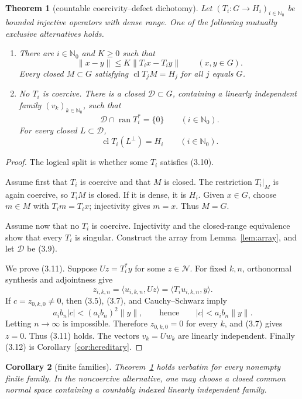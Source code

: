 \documentclass[11pt]{article}
\newtheorem{theorem}{Theorem}[section]
\newtheorem{corollary}[theorem]{Corollary}
\newcommand{\N}{\mathbb N_0}
\newcommand{\ran}{\operatorname{ran}}
\newcommand{\clos}{\operatorname{cl}}
\newcommand{\cD}{\mathcal D}
\newcommand{\cN}{\mathcal N}
\newcommand{\ip}[2]{\langle #1,#2\rangle}
\begin{document}
\begin{theorem}[countable coercivity--defect dichotomy]\label{thm:dichotomy}
Let \((T_i:G\to H_i)_{i\in\N}\) be bounded injective operators with dense
range.  One of the following mutually exclusive alternatives holds.
\begin{enumerate}[label=\textup{(\Roman*)}]
  \item There are \(i\in\N\) and \(K\ge0\) such that
  \[
    \|x-y\|\le K\|T_i x-T_i y\|\qquad(x,y\in G).
    \tag{3.10}
  \]
  Every closed \(M\subset G\) satisfying
  \(\clos{T_jM}=H_j\) for all \(j\) equals \(G\).

  \item No \(T_i\) is coercive.  There is a closed
  \(\cD\subset G\), containing a linearly independent family
  \((v_k)_{k\in\N}\), such that
  \[
    \cD\cap\ran T_i^*=\{0\}\qquad(i\in\N).
    \tag{3.11}
  \]
  For every closed \(L\subset\cD\),
  \[
    \clos{T_i(L^\perp)}=H_i\qquad(i\in\N).
    \tag{3.12}
  \]
\end{enumerate}
\end{theorem}

\begin{proof}
The logical split is whether some \(T_i\) satisfies (3.10).

Assume first that \(T_i\) is coercive and that \(M\) is closed.  The
restriction \(T_i|_M\) is again coercive, so \(T_iM\) is closed.  If it is
dense, it is \(H_i\).  Given \(x\in G\), choose \(m\in M\) with
\(T_im=T_ix\); injectivity gives \(m=x\).  Thus \(M=G\).

Assume now that no \(T_i\) is coercive.  Injectivity and the closed-range
equivalence show that every \(T_i\) is singular.  Construct the array from
Lemma~\ref{lem:array}, and let \(\cD\) be (3.9).

We prove (3.11).  Suppose \(Uz=T_i^*y\) for some \(z\in\cN\).  For fixed
\(k,n\), orthonormal synthesis and adjointness give
\[
  z_{i,k,n}
   =\ip{u_{i,k,n}}{Uz}
   =\ip{T_i u_{i,k,n}}{y}.
  \tag{3.13}
\]
If \(c=z_{0,k,0}\ne0\), then (3.5), (3.7), and Cauchy--Schwarz imply
\[
  a_i b_n|c|
   <(a_i b_n)^2\|y\|,
  \qquad\text{hence}\qquad
  |c|<a_i b_n\|y\|.
  \tag{3.14}
\]
Letting \(n\to\infty\) is impossible.  Therefore
\(z_{0,k,0}=0\) for every \(k\), and (3.7) gives \(z=0\).
Thus (3.11) holds.  The vectors \(v_k=Uw_k\) are linearly independent.
Finally (3.12) is Corollary~\ref{cor:hereditary}.
\end{proof}

\begin{corollary}[finite families]\label{cor:finite}
Theorem~\ref{thm:dichotomy} holds verbatim for every nonempty finite family.
In the noncoercive alternative, one may choose a closed common normal space
containing a countably indexed linearly independent family.
\end{corollary}
\end{document}
